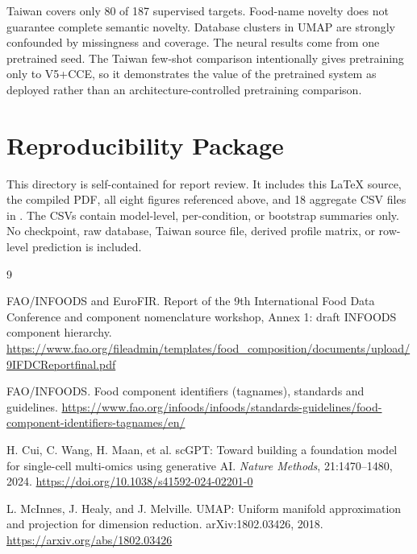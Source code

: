\documentclass[11pt]{article}
\begin{document}
Taiwan covers only 80 of 187 supervised targets. Food-name novelty does not guarantee complete semantic novelty. Database clusters in UMAP are strongly confounded by missingness and coverage. The neural results come from one pretrained seed. The Taiwan few-shot comparison intentionally gives pretraining only to V5+CCE, so it demonstrates the value of the pretrained system as deployed rather than an architecture-controlled pretraining comparison.

\section{Reproducibility Package}

This directory is self-contained for report review. It includes this \LaTeX{} source, the compiled PDF, all eight figures referenced above, and 18 aggregate CSV files in . The CSVs contain model-level, per-condition, or bootstrap summaries only. No checkpoint, raw database, Taiwan source file, derived profile matrix, or row-level prediction is included.

\begin{thebibliography}{9}

FAO/INFOODS and EuroFIR.
\newblock Report of the 9th International Food Data Conference and component nomenclature workshop, Annex 1: draft INFOODS component hierarchy.
\newblock \url{https://www.fao.org/fileadmin/templates/food_composition/documents/upload/9IFDCReportfinal.pdf}

FAO/INFOODS.
\newblock Food component identifiers (tagnames), standards and guidelines.
\newblock \url{https://www.fao.org/infoods/infoods/standards-guidelines/food-component-identifiers-tagnames/en/}

H. Cui, C. Wang, H. Maan, et al.
\newblock scGPT: Toward building a foundation model for single-cell multi-omics using generative AI.
\newblock \emph{Nature Methods}, 21:1470--1480, 2024.
\newblock \url{https://doi.org/10.1038/s41592-024-02201-0}

L. McInnes, J. Healy, and J. Melville.
\newblock UMAP: Uniform manifold approximation and projection for dimension reduction.
\newblock arXiv:1802.03426, 2018.
\newblock \url{https://arxiv.org/abs/1802.03426}

\end{thebibliography}
\end{document}
